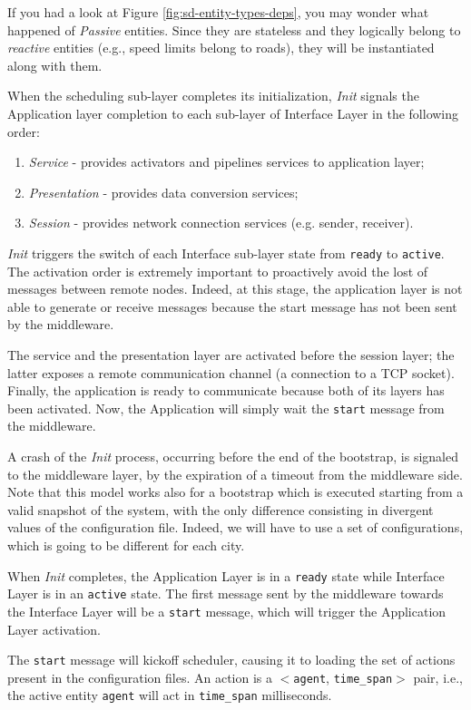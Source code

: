 If you had a look at Figure \ref{fig:sd-entity-types-deps}, you may wonder what
happened of \textit{Passive} entities. Since they are stateless and they
logically belong to \textit{reactive} entities (e.g., speed limits belong to
roads), they will be instantiated along with them.

When the scheduling sub-layer completes its initialization, \textit{Init}
signals the Application layer completion to each sub-layer of Interface Layer
in the following order:

\begin{enumerate}
  \item \textit{Service} - provides activators and pipelines services to
    application layer;
  \item \textit{Presentation} - provides data conversion services;
  \item \textit{Session} - provides network connection services (e.g. sender,
    receiver).
\end{enumerate}

\textit{Init} triggers the switch of each Interface sub-layer state from
\verb|ready| to \verb|active|.
The activation order is extremely important to proactively avoid the lost of
messages between remote nodes. Indeed, at this stage, the application layer is
not able to generate or receive messages because the start message has not
been sent by the middleware.

The service and the presentation layer are activated before the session layer;
the latter exposes a remote communication channel (a connection to a TCP
socket).
Finally, the application is ready to communicate because both of its layers
has been activated. Now, the Application will simply wait the \verb|start|
message from the middleware.

A crash of the \textit{Init} process, occurring before the end of the
bootstrap, is signaled to the middleware layer, by the expiration of a timeout
from the middleware side.
Note that this model works also for a bootstrap which is executed starting
from a valid snapshot of the system, with the only difference consisting in
divergent values of the configuration file. Indeed, we will have to use a set
of configurations, which is going to be different for each city.


When \textit{Init} completes, the Application Layer is in a \verb|ready| state
while Interface Layer is in an \verb|active| state.
The first message sent by the middleware towards the Interface Layer will be a
\verb|start| message, which will trigger the Application Layer activation.

The \verb|start| message will kickoff scheduler, causing it to loading the set
of actions present in the configuration files. An action is a $<$\verb|agent|,
\verb|time_span|$>$ pair, i.e., the active entity \verb|agent| will act in
\verb|time_span| milliseconds.

